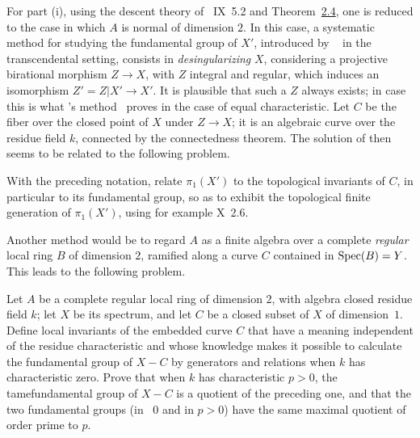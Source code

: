 For part (i), using the descent theory of ~IX~5.2 and
Theorem\pageoriginale~\hyperref[XIII.2.4]{2.4}, one is reduced to the case in which $A$ is normal of
dimension $2$. In this case, a systematic method for studying the
fundamental group of $X'$, introduced by ~\cite{XIII.5}
in the transcendental setting, consists in \emph{desingularizing} $X$,
\ie considering a projective birational morphism $Z\to X$, with $Z$
integral and regular, which induces an isomorphism
$Z'=Z|X'\to X'$. It is plausible that such a $Z$ always exists; in
 case this is what 's method~\cite{XIII.1}
proves in the case of \og equal characteristic\fg{}. Let $C$ be the fiber over the
closed point of $X$ under $Z\to X$; it is an algebraic curve over the
residue field $k$, connected by the connectedness theorem. The solution
of  then seems to be related to the following problem.

\begin{probleme} \label{XIII.3.2}
With the preceding notation, relate $\pi_1(X')$ to the topological
invariants of $C$, in particular to its fundamental group, so as to
exhibit the topological finite generation of $\pi_1(X')$, using for
example \SGA {}\textup{X~2.6}.
\end{probleme}

Another method would be to regard $A$ as a finite algebra over a
complete \emph{regular} local ring $B$ of dimension $2$, ramified along
a curve $C$ contained in $\operatorname{Spec}(B)=Y$. This leads to the following
problem.

\begin{probleme} \label{XIII.3.3}
Let $A$ be a complete regular local ring of dimension $2$, with
algebra closed residue field $k$; let $X$ be its spectrum,
and let $C$ be a closed subset of $X$ of dimension~$1$. Define local
invariants of the embedded curve $C$ that have a meaning independent of
the residue characteristic and whose knowledge makes it possible to
calculate the fundamental group of $X-C$ by generators and relations
when $k$ has characteristic zero. Prove that when $k$ has characteristic
$p>0$, the \og tame\fg fundamental group of $X-C$ is a quotient of the
preceding one, and that the two fundamental groups (in
~$0$ and in
 $p>0$) have the same maximal quotient of
order prime to $p$.
\end{probleme}


